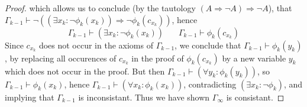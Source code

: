 \begin{proof}
    which allows us to conclude (by the tautology $(A \Rightarrow \neg A) \Rightarrow \neg A$), that $\Gamma_{k-1} \vdash \neg ((\exists x_k: \neg \phi_k(x_k)) \Rightarrow \neg \phi_k(c_{x_k}))$, hence
    \[ \Gamma_{k-1} \vdash (\exists x_k: \neg \phi_k(x_k))\ \ \ \ \ \ \ \ \Gamma_{k-1} \vdash \phi_k(c_{x_k}) \]
    Since $c_{x_k}$ does not occur in the axioms of $\Gamma_{k-1}$, we conclude that $\Gamma_{k-1} \vdash \phi_k(y_k)$, by replacing all occurences of $c_{x_k}$ in the proof of $\phi_k(c_{x_k})$ by a new variable $y_k$ which does not occur in the proof. But then $\Gamma_{k-1} \vdash (\forall y_k: \phi_k(y_k))$, so $\Gamma_{k-1} \vdash \phi_k(x_k)$, hence $\Gamma_{k-1} \vdash (\forall x_k: \phi_k(x_k))$, contradicting $(\exists x_k: \neg \phi_k)$, and implying that $\Gamma_{k-1}$ is inconsistant. Thus we have shown $\Gamma_\infty$ is consistant.
\end{proof}

